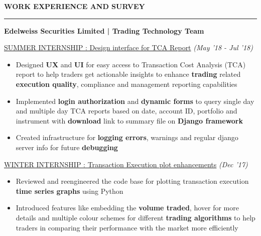 \documentclass[10 pt]{article}%
\begin{document}
\vspace*{3.6cm}

\begin{flushleft}\textbf{\large{WORK EXPERIENCE AND SURVEY}}\end{flushleft}
\vspace{-1.5mm}
\hrule
{\flushleft \bf {\large{Edelweiss Securities Limited | Trading Technology Team}}}%
\vspace{-0.3em}
{\flushleft \textrm{\underline{SUMMER INTERNSHIP : Design interface for TCA Report} } \hfill {{{\em{(May '18 - Jul '18)}}}}
	\vspace{-1mm}
\begin{itemize}[leftmargin=*]
    \setlength\itemsep{1pt}
    \setlength\parskip{1pt}
    \item Designed \textbf{UX} and \textbf{UI} for easy access to Transaction Cost Analysis (TCA) report to help traders get actionable insights to enhance \textbf{trading} related \textbf{execution quality}, compliance and management reporting capabilities
\item Implemented \textbf{login authorization} and \textbf{dynamic forms} to query single day and multiple day TCA reports based on date, account ID, portfolio and instrument with \textbf{download} link to summary file on \textbf{Django framework}
\item Created infrastructure for \textbf{logging errors}, warnings and regular django server info for future \textbf{debugging}
\end{itemize}
\vspace{-12pt}
{\flushleft \textrm{\underline{WINTER INTERNSHIP : Transaction Execution plot enhancements} } \hfill {{{\em{(Dec '17)}}}}
	\vspace{-1mm}
\begin{itemize}[leftmargin=*]
	\setlength\itemsep{1pt}
	\setlength\parskip{1pt}
	\item Reviewed and reengineered the code base for plotting transaction execution \textbf{time series graphs} using Python
	\item Introduced features like embedding the \textbf{volume traded}, hover for more details and multiple colour schemes for different \textbf{trading algorithms} to help traders in comparing their performance with the market more efficiently
\end{itemize}

}}
\end{document}
